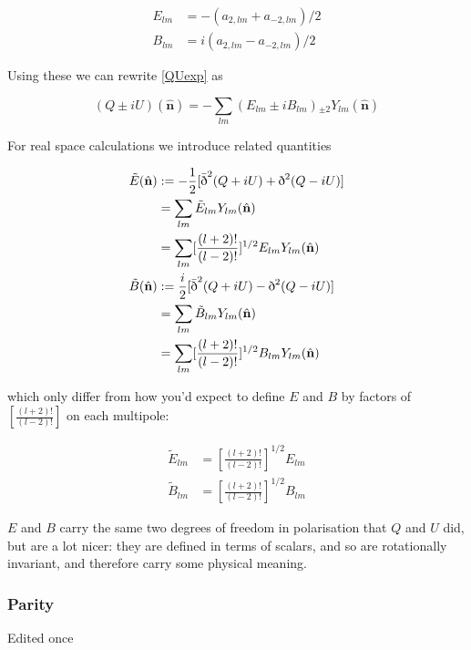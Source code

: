 \documentclass[a4paper,10pt]{article}
\renewcommand{\v}[1]{\mathbf{#1}}
\newcommand{\half}{\frac{1}{2}}
\newcommand{\unit}[1]{\hat{\v{#1}}}
\newcommand{\sr}{\text{\normalfont\dh}}
\renewcommand{\sl}{\bar{\text{\normalfont\dh}}}
\newcommand{\ltwo}{[\frac{(l+2)!}{(l-2)!}]}
\begin{document}
\begin{equation}\begin{split} 
E_{lm} &= -(a_{2,lm} + a_{-2,lm})/2\\
B_{lm} &= i(a_{2,lm} - a_{-2,lm})/2
\end{split}\end{equation}

Using these we can rewrite \ref{QUexp} as 

\begin{equation}
(Q\pm iU)(\unit{n}) = -\sum_{lm} (E_{lm} \pm i B_{lm}) {}_{\pm2}Y_{lm}(\unit{n})
\label{QUEB}
\end{equation}

For real space calculations we introduce related quantities 

\begin{equation}\begin{split}
\tilde{E}(\unit{n}) &:= -\half[\sl^2(Q+iU) + \sr^2(Q-iU)]\\
&= \sum_{lm} \tilde{E}_{lm}Y_{lm}(\unit{n})\\
&= \sum_{lm} \ltwo^{1/2}E_{lm}Y_{lm}(\unit{n})\\
\tilde{B}(\unit{n}) &:= \frac{i}{2}[\sl^2(Q+iU) - \sr^2(Q-iU)]\\
&= \sum_{lm} \tilde{B}_{lm}Y_{lm}(\unit{n})\\
&= \sum_{lm} \ltwo^{1/2}B_{lm}Y_{lm}(\unit{n})
\label{EBmodes}
\end{split}\end{equation}

which only differ from how you'd expect to define $E$ and $B$ by factors of $\ltwo$ on each multipole: 

\begin{equation}\begin{split}
\tilde{E}_{lm}&=\ltwo^{1/2}E_{lm}\\
\tilde{B}_{lm}&=\ltwo^{1/2}B_{lm}
\label{EBtwiddle}
\end{split}\end{equation}

$E$ and $B$ carry the same two degrees of freedom in polarisation that $Q$ and $U$ did, but are a lot nicer: they are defined in terms of scalars, and so are rotationally invariant, and therefore carry some physical meaning.

\subsubsection{Parity}
Edited once
\end{document}
